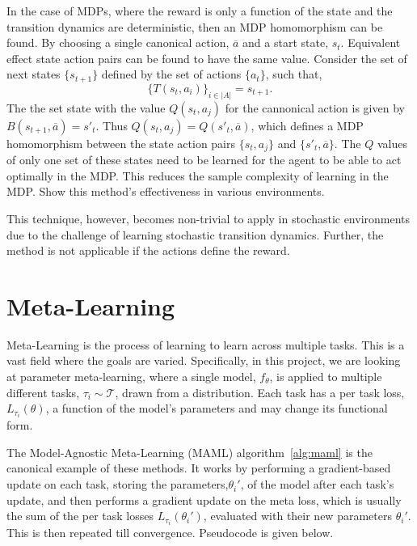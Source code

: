 In the case of MDPs, where the reward is only a function of the state and the transition dynamics are deterministic, then an MDP homomorphism can be found. By choosing a single canonical action, $\overline{a}$ and a start state, $s_t$. Equivalent effect state action pairs can be found to have the same value. Consider the set of next states $\{s_{t+1}\}$ defined by the set of actions $\{a_t\}$, such that,
\begin{equation}
	\{T(s_t, a_i)\}_{i \in |A| }= {s_{t+1}}.
\end{equation}
The the set state with the value $Q(s_t, a_j)$ for the cannonical action is given by $B(s_{t+1}, \overline{a}) = s'_t$. Thus $Q(s_t, a_j) = Q(s'_t, \overline{a})$, which defines a MDP homomorphism between the state action pairs $\{s_t, a_j\}$ and $\{s'_t, \overline{a}\}$. The $Q$ values of only one set of these states need to be learned for the agent to be able to act optimally in the MDP. This reduces the sample complexity of learning in the MDP. \cite{mavor2022simple} Show this method's effectiveness in various environments.

This technique, however, becomes non-trivial to apply in stochastic environments due to the challenge of learning stochastic transition dynamics. Further, the method is not applicable if the actions define the reward.



\section{Meta-Learning}
Meta-Learning is the process of learning to learn across multiple tasks. This is a vast field where the goals are varied. Specifically, in this project, we are looking at parameter meta-learning, where a single model, $f_\theta$, is applied to multiple different tasks, $\tau_i \sim \mathcal{T}$, drawn from a distribution.
Each task has a per task loss, $L_{\tau_i}(\theta)$, a function of the model's parameters and may change its functional form.


The Model-Agnostic Meta-Learning (MAML) algorithm~\ref{alg:maml} is the canonical example of these methods. It works by performing a gradient-based update on each task, storing the parameters,$\theta_i'$, of the model after each task's update, and then performs a gradient update on the meta loss, which is usually the sum of the per task losses $L_{\tau_i}(\theta_i')$, evaluated with their new parameters $\theta_i'$. This is then repeated till convergence. Pseudocode is given below.


